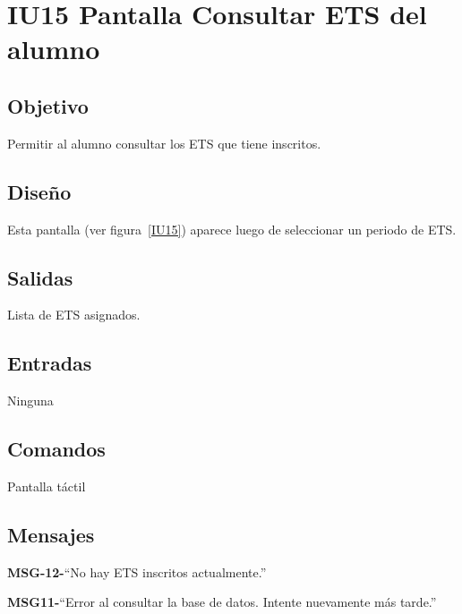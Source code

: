 \section{IU15 Pantalla Consultar ETS del alumno}

\subsection{Objetivo}
Permitir al alumno consultar los ETS que tiene inscritos. 

\subsection{Diseño}
Esta pantalla  (ver figura~\ref{IU15}) aparece luego de seleccionar un periodo de ETS. 


\subsection{Salidas}
Lista de ETS asignados. 

\subsection{Entradas}
Ninguna


\subsection{Comandos}

Pantalla táctil


\subsection{Mensajes}

\begin{Citemize}
	\item {\bf MSG-12-}{``No hay ETS inscritos actualmente.''}
	\item {\bf MSG11-}{``Error al consultar la base de datos. Intente nuevamente más tarde.''}
\end{Citemize}
